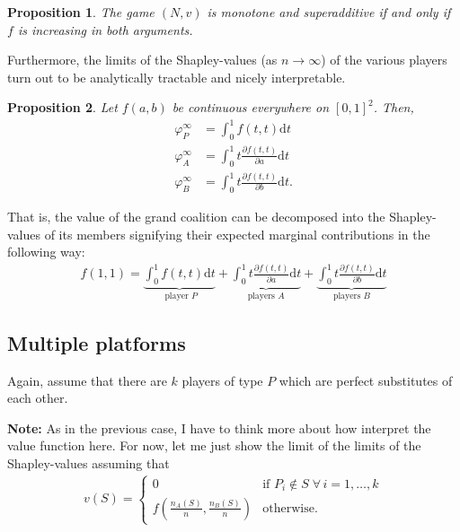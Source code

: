 \documentclass[a4paper]{article}
\newtheorem{proposition}{Proposition}
\newcommand{\dt}{\mathrm{d}t}
\begin{document}
\begin{proposition}
    The game $(N, v)$ is monotone and superadditive if and only if $f$ is increasing in both arguments.
\end{proposition}

Furthermore, the limits of the Shapley-values (as $n \to \infty$) of the various players turn out to be analytically tractable and nicely interpretable.

\begin{proposition}
    Let $f(a, b)$ be continuous everywhere on $[0, 1]^2$. Then,
    \begin{align*}
        \varphi_P^\infty & = \int_0^1 f(t, t) \dt                                 \\
        \varphi_A^\infty & = \int_0^1 t \frac{\partial f(t, t)}{\partial a} \dt   \\
        \varphi_B^\infty & = \int_0^1 t \frac{\partial f(t, t)}{\partial b} \dt .
    \end{align*}
\end{proposition}

That is, the value of the grand coalition can be decomposed into the Shapley-values of its members signifying their expected marginal contributions in the following way:
\begin{align*}
    f(1, 1) = \underbrace{\int_0^1 f(t, t) \dt}_{\text{ player } P} + \underbrace{\int_0^1 t \frac{\partial f(t, t)}{\partial a} \dt}_{\text{players } A} + \underbrace{\int_0^1 t \frac{\partial f(t, t)}{\partial b} \dt}_{\text{players } B}
\end{align*}


\subsection{Multiple platforms}

Again, assume that there are $k$ players of type $P$ which are perfect substitutes of each other.

\textbf{Note:} As in the previous case, I have to think more about how interpret the value function here. For now, let me just show the limit of the limits of the Shapley-values assuming that
\begin{align*}
    v(S) = \begin{cases}
        0                                                & \text{if } P_i \notin S \; \forall \, i = 1, \dots, k \\
        f\left(\frac{n_A(S)}{n}, \frac{n_B(S)}{n}\right) & \text{otherwise}.
    \end{cases}
\end{align*}
\end{document}
